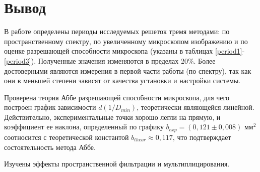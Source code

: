 \documentclass[12pt]{kiarticle} %
\begin{document}
\section{Вывод} 

В работе определены периоды исследуемых решеток тремя методами: по пространственному спектру, по увеличенному микроскопом изображению и по оценке разрешающей способности микроскопа (указаны в таблицах \ref{period1}-\ref{period3}). Полученные значения изменяются в пределах 20\%. Более достоверными являются измерения в первой части работы (по спектру), так как они в меньшей степени зависят от качества установки и настройки системы. 

Проверена теория Аббе разрешающей способности микроскопа, для чего построен график зависимости $d(1/D_{min})$, теоретически являющейся линейной. Действительно, экспериментальные точки хорошо легли на прямую, и коэффициент ее наклона, определенный по графику $b_{exp} = (0,121 \pm 0,008) \text{ мм}^2$ соотносится с теоретической константой $b_{theor} \approx 0,117$, что подтверждает состоятельность метода Аббе.

Изучены эффекты пространственной фильтрации и мультиплицирования.  
	
\end{document}
